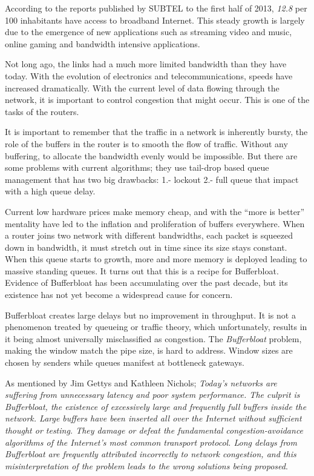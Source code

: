 According to the reports published by SUBTEL to the first half of 2013,
\textit{12.8} per 100 inhabitants have access to broadband
Internet\cite{OCDE}.  This steady growth is largely due to the emergence of
new applications such as streaming video and music, online gaming and
bandwidth intensive applications.

Not long ago, the links had a much more limited bandwidth than they have
today. With the evolution of electronics and telecommunications,
speeds have increased dramatically. With the current level of data flowing
through the network, it is important to control congestion that
might occur. This is one of the tasks of the routers.

It is important to remember that the traffic in a network is inherently
bursty, the role of the buffers in the router is to smooth the flow of
traffic. Without any buffering, to allocate the bandwidth evenly would be
impossible. But there are some problems with current algorithms; they use
tail-drop based queue management that has two big drawbacks: 1.- lockout 2.-
full queue that impact with a high queue delay.

Current low hardware prices make memory cheap,
and with the ``more is better'' mentality have led to the inflation and
proliferation of buffers everywhere\cite{NicholsJacobsonCQD}. When a router
joins two network with different bandwidths, each packet is squeezed down in
bandwidth, it must stretch out in time since its size stays constant. When
this queue starts to growth, more and more memory is deployed leading to
massive standing queues. It turns out that this is a recipe for Bufferbloat.
Evidence of Bufferbloat has been accumulating over the past decade, but its
existence has not yet become a widespread cause for concern.

Bufferbloat creates large delays but no improvement in throughput. It is not a
phenomenon treated by queueing or traffic theory, which unfortunately, results
in it being almost universally misclassified as congestion. The \textit{\gls{Bufferbloat}}
problem, making the window match the pipe size, is hard to address. Window
sizes are chosen by senders while queues manifest at bottleneck gateways.


As mentioned by Jim Gettys and Kathleen Nichols;
\textit{Today's networks are suffering from unnecessary latency and poor
system performance. The culprit is Bufferbloat, the existence of excessively
large and frequently full buffers inside the network. Large buffers have been
inserted all over the Internet without sufficient thought or testing. They
damage or defeat the fundamental congestion-avoidance algorithms of the
Internet's most common transport protocol. Long delays from Bufferbloat are
frequently attributed incorrectly to network congestion, and this
misinterpretation of the problem leads to the wrong solutions being
proposed}\cite{GettysNichols}.

